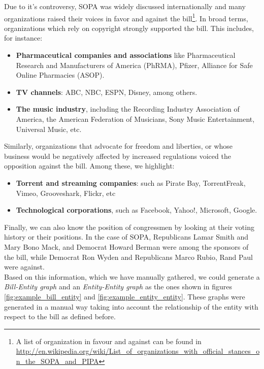Due to it's controversy, SOPA was widely discussed internationally and many organizations raised their voices in favor and against the bill\footnote{A list of organization in favour and against can be found in \url{http://en.wikipedia.org/wiki/List_of_organizations_with_official_stances_on_the_SOPA_and_PIPA}}. In broad terms, organizations which rely on copyright strongly supported the bill. This includes, for instance:

\begin{itemize}
\item {\bf Pharmaceutical companies and associations}  like Pharmaceutical Research and Manufacturers of America (PhRMA), Pfizer, Alliance for Safe Online Pharmacies (ASOP). 
\item {\bf TV channels}: ABC, NBC, ESPN, Disney, among others. 
\item {\bf The music industry}, including the Recording Industry Association of America, the American Federation of Musicians, Sony Music Entertainment, Universal Music, etc.
\end{itemize}

Similarly, organizations that advocate for freedom and liberties, or whose business would be negatively affected by increased regulations voiced the opposition against the bill. Among these, we highlight:

\begin{itemize}
\item {\bf Torrent and streaming companies}: such as Pirate Bay, TorrentFreak, Vimeo, Grooveshark, Flickr, etc
\item {\bf Technological corporations}, such as Facebook, Yahoo!, Microsoft, Google.
\end{itemize}

Finally, we can also know the position of congressmen by looking at their voting history or their positions. In the case of SOPA, Republicans Lamar Smith and Mary Bono Mack, and Democrat Howard Berman were among the sponsors of the bill, while Democrat Ron Wyden and Republicans Marco Rubio, Rand Paul were against.\\

Based on this information, which we have manually gathered, we could generate a \emph{Bill-Entity graph} and an \emph{Entity-Entity graph} as the ones shown in figures \ref{fig:example_bill_entity} and \ref{fig:example_entity_entity}. These graphs were generated in a manual way taking into account the relationship of the entity with respect to the bill as defined before. \\

